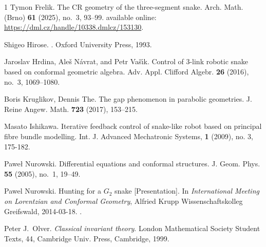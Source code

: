 \documentclass{amsart}
\theoremstyle{plain}
\theoremstyle{definition}
\theoremstyle{remark}
\begin{document}
\begin{thebibliography}{1}
Tymon Frelik.
\newblock The CR geometry of the three-segment snake.
\newblock Arch. Math. (Brno) {\bf 61} (2025), no.~3, 93--99.
\newblock available online: \url{https://dml.cz/handle/10338.dmlcz/153130}.


Shigeo Hirose.
.
\newblock Oxford University Press, 1993.

Jaroslav Hrdina, Ale{\v{s}} N{\'a}vrat, and Petr Va{\v{s}}{\'\i}k.
\newblock Control of 3-link robotic snake based on conformal geometric algebra.
\newblock Adv. Appl. Clifford Algebr. {\bf 26} (2016), no.~3, 1069--1080.

Boris Kruglikov, Dennis The.
\newblock The gap phenomenon in parabolic geometries.
\newblock J. Reine Angew. Math. {\bf 723} (2017), 153--215.

Masato Ishikawa.
\newblock Iterative feedback control of snake-like robot based
on principal fibre bundle modelling.
\newblock Int. J. Advanced Mechatronic Systems, {\bf 1} (2009), no. 3, 175-182.

Paweł Nurowski.
\newblock Differential equations and conformal structures.
\newblock J. Geom. Phys. {\bf 55} (2005), no.~1, 19--49.

Pawel Nurowski.
\newblock Hunting for a $G_2$ snake [{P}resentation].
\newblock In {\em International Meeting on Lorentzian and Conformal Geometry}, Alfried Krupp Wissenschaftskolleg Greifswald, 2014-03-18.
.

Peter J.~Olver.
\newblock \emph{Classical invariant theory}.
\newblock London Mathematical Society Student Texts, 44, Cambridge Univ. Press, Cambridge, 1999.


\end{thebibliography}
\end{document}
